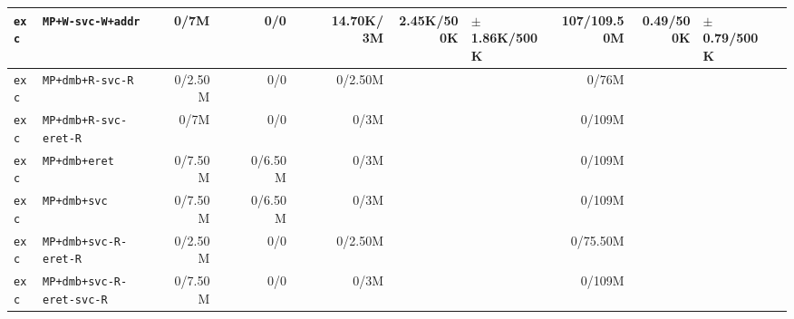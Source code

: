 \begin{tabular}{l l  | r r l | r r l | r r l | r r l l}
         \verb|exc| &                                     \verb|MP+W-svc-W+addr| &           0/7M &                       &                   &            0/0 &                       &                 &      14.70K/3M &            2.45K/500K &  $\pm$ 1.86K/500K &    107/109.50M &             0.49/500K &   $\pm$ 0.79/500K & \\ \hline 
         \verb|exc| &                                      \verb|MP+dmb+R-svc-R| &        0/2.50M &                       &                   &            0/0 &                       &                 &        0/2.50M &                       &                   &          0/76M &                       &                   & \\ \hline 
         \verb|exc| &                                 \verb|MP+dmb+R-svc-eret-R| &           0/7M &                       &                   &            0/0 &                       &                 &           0/3M &                       &                   &         0/109M &                       &                   & \\ \hline 
         \verb|exc| &                                         \verb|MP+dmb+eret| &        0/7.50M &                       &                   &        0/6.50M &                       &                 &           0/3M &                       &                   &         0/109M &                       &                   & \\ \hline 
         \verb|exc| &                                          \verb|MP+dmb+svc| &        0/7.50M &                       &                   &        0/6.50M &                       &                 &           0/3M &                       &                   &         0/109M &                       &                   & \\ \hline 
         \verb|exc| &                                 \verb|MP+dmb+svc-R-eret-R| &        0/2.50M &                       &                   &            0/0 &                       &                 &        0/2.50M &                       &                   &       0/75.50M &                       &                   & \\ \hline 
         \verb|exc| &                             \verb|MP+dmb+svc-R-eret-svc-R| &        0/7.50M &                       &                   &            0/0 &                       &                 &           0/3M &                       &                   &         0/109M &                       &                   & \\ \hline 

\end{tabular}
